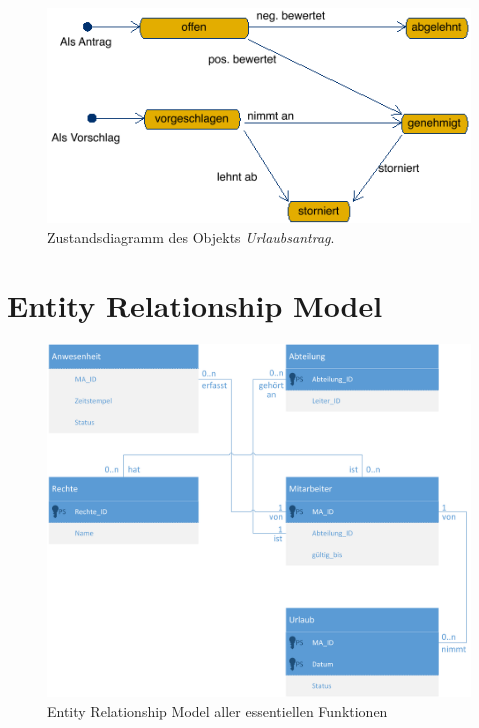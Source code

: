 \vspace{1cm}
\begin{figure}[hbp]
	\centering
	\includegraphics[width=0.9\linewidth]{UML/Export/Urlaubsantrag.png}
	\caption{Zustandsdiagramm des Objekts \textit{Urlaubsantrag}.}
	\label{Uantrag}
\end{figure}

\newpage

\chapter{Entity Relationship Model}

\begin{figure}[hbp]
	\centering
	\includegraphics[width=1\linewidth]{UML/Export/erm.png}
	\caption{Entity Relationship Model aller essentiellen Funktionen}
	\label{ERM}
\end{figure}

